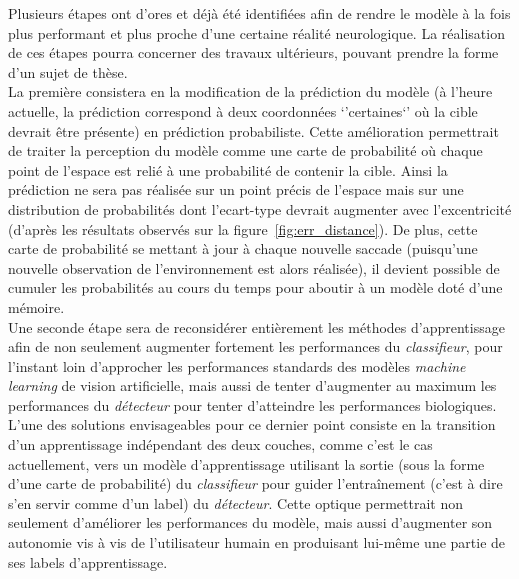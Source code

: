 	
Plusieurs étapes ont d'ores et déjà été identifiées afin de rendre le modèle à la fois plus performant et plus proche d'une certaine réalité neurologique. La réalisation de ces étapes pourra concerner des travaux ultérieurs, pouvant prendre la forme d'un sujet de thèse.\\
La première consistera en la modification de la prédiction du modèle (à l'heure actuelle, la prédiction correspond à deux coordonnées `'certaines`' où la cible devrait être présente) en prédiction probabiliste. 
Cette amélioration permettrait de traiter la perception du modèle comme une carte de probabilité où chaque point de l'espace est relié à une probabilité de contenir la cible. Ainsi la prédiction ne sera pas réalisée sur un point précis de l'espace mais sur une distribution de probabilités dont l'ecart-type devrait augmenter avec l'excentricité (d'après les résultats observés sur la figure~\ref{fig:err_distance}). De plus, cette carte de probabilité se mettant à jour à chaque nouvelle saccade (puisqu'une nouvelle observation de l'environnement est alors réalisée), il devient possible de cumuler les probabilités au cours du temps pour aboutir à un modèle doté d'une mémoire. \autocite{Butko2010, Najemnik2005} \\

Une seconde étape sera de reconsidérer entièrement les méthodes d'apprentissage afin de non seulement augmenter fortement les performances du \textit{classifieur}, pour l'instant loin d'approcher les performances standards des modèles \textit{machine learning} de vision artificielle, mais aussi de tenter d'augmenter au maximum les performances du \textit{détecteur} pour tenter d'atteindre les performances biologiques. \\
L'une des solutions envisageables pour ce dernier point consiste en la transition d'un apprentissage indépendant des deux couches, comme c'est le cas actuellement, vers un modèle d'apprentissage utilisant la sortie (sous la forme d'une carte de probabilité) du \textit{classifieur} pour guider l'entraînement (c'est à dire s'en servir comme d'un label) du \textit{détecteur}. Cette optique permettrait non seulement d'améliorer les performances du modèle, mais aussi d'augmenter son autonomie vis à vis de l'utilisateur humain en produisant lui-même une partie de ses labels d'apprentissage. \\

